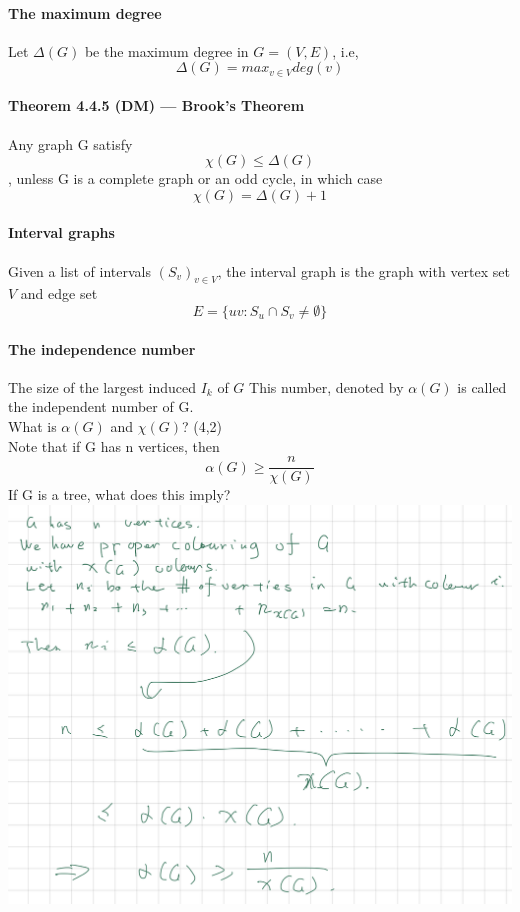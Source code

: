 \documentclass{article}
\begin{document}
\paragraph{The maximum degree}
Let $\Delta (G)$ be the maximum degree in $G=(V,E)$, i.e,
$$\Delta (G)=max_{v \in V}deg(v) $$
\paragraph{Theorem 4.4.5 (DM) — Brook’s Theorem}
Any graph G satisfy $$\chi (G)\leq \Delta (G)$$, unless G is a complete graph or an odd cycle, in which case $$\chi (G)=\Delta (G)+1$$
\paragraph{Interval graphs} Given a list of intervals $(S_v)_{v\in V}$, the interval graph is the graph with vertex set $V$ and edge set $$E=\{uv:S_u\cap S_v\neq \emptyset\}$$
\paragraph{The independence number} 
The size of the largest induced $I_k$ of $G$
This number, denoted by $\alpha(G)$ is called the independent number of G.\\
What is $\alpha(G)$ and $\chi(G)$? (4,2)\\
Note that if G has n vertices, then $$\alpha(G)\ge \frac{n}{\chi(G)}$$
If G is a tree, what does this imply?\\
\includegraphics{0099}
\end{document}
